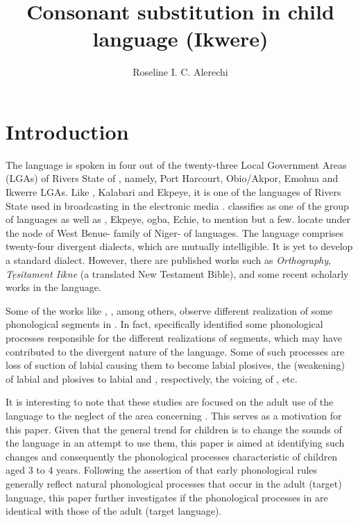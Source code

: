 \documentclass[output=paper,
modfonts
]{langscibook}
\title{Consonant substitution in child language (Ikwere)}
\author{Roseline I. C. Alerechi \affiliation{University of Port Harcourt}}
\begin{document}
 

\maketitle  


\section{Introduction}\label{sec:alerechi:1}

The  language is spoken in four out of the twenty-three Local Government Areas (LGAs) of Rivers State of , namely, Port Harcourt, Obio/Akpor, Emohua and Ikwerre LGAs. Like , Kalabari and Ekpeye, it is one of the  languages of Rivers State used in broadcasting in the electronic media \citep[1]{Alerechi2007a}. \citet[67, 71]{Williamson1988} classifies  as one of the  group of languages as well as , Ekpeye, ogba, Echie, to mention but a few.  \citet[31]{Williamson2000} locate  under the node of West Benue- family of Niger-  of languages. The  language comprises twenty-four divergent dialects, which are mutually intelligible. It is yet to develop a standard dialect. However, there are published works such as  \textit{ Orthography}, \textit{Tẹsitament Iikne} (a translated New Testament Bible), and some recent scholarly works in the language. 

Some of the works like \citet{Williamson1980},  \citet{Donwa-Ifode2001}, among others, observe different realization of some phonological segments in . In fact, \citet{Alerechi2007a} specifically identified some phonological processes responsible for the different realizations of segments, which may have contributed to the divergent nature of the  language. Some of such processes are loss of suction of labial  causing them to become labial plosives, the  (weakening) of labial and  plosives to labial and  , respectively, the voicing of  , etc. 

It is interesting to note that these studies are focused on the adult use of the  language to the neglect of the area concerning . This serves as a motivation for this paper. Given that the general trend for children is to change the sounds of the language in an attempt to use them, this paper is aimed at identifying such changes and consequently the phonological processes characteristic of  children aged 3 to 4 years. Following the assertion of \citet[358]{FromkinEtAl2003} that early phonological rules generally reflect natural phonological processes that occur in the adult (target) language, this paper further investigates if the phonological processes in  are identical with those of the adult (target language).
\end{document}
